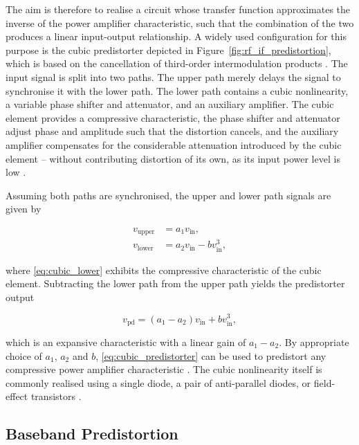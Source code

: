 The aim is therefore to realise a circuit whose transfer function approximates the inverse of the power amplifier characteristic, such that the combination of the two produces a linear input-output relationship. A widely used configuration for this purpose is the cubic predistorter depicted in Figure~\ref{fig:rf_if_predistortion}, which is based on the cancellation of third-order intermodulation products \cite{durukal}. The input signal is split into two paths. The upper path merely delays the signal to synchronise it with the lower path. The lower path contains a cubic nonlinearity, a variable phase shifter and attenuator, and an auxiliary amplifier. The cubic element provides a compressive characteristic, the phase shifter and attenuator adjust phase and amplitude such that the distortion cancels, and the auxiliary amplifier compensates for the considerable attenuation introduced by the cubic element -- without contributing distortion of its own, as its input power level is low \cite{durukal}.

Assuming both paths are synchronised, the upper and lower path signals are given by

\begin{align}
  v_{\text{upper}} &= a_1 v_{\text{in}}, \label{eq:cubic_upper} \\
  v_{\text{lower}} &= a_2 v_{\text{in}} - b v_{\text{in}}^3, \label{eq:cubic_lower}
\end{align}

where \eqref{eq:cubic_lower} exhibits the compressive characteristic of the cubic element. Subtracting the lower path from the upper path yields the predistorter output

\begin{equation}
  v_{\text{pd}} = \left(a_1 - a_2\right) v_{\text{in}} + b v_{\text{in}}^3 ,
  \label{eq:cubic_predistorter}
\end{equation}

which is an expansive characteristic with a linear gain of $a_1 - a_2$. By appropriate choice of $a_1$, $a_2$ and $b$, \eqref{eq:cubic_predistorter} can be used to predistort any compressive power amplifier characteristic \cite{durukal, kenington}. The cubic nonlinearity itself is commonly realised using a single diode, a pair of anti-parallel diodes, or field-effect transistors \cite{durukal}.

\subsection{Baseband Predistortion}\label{sec:baseband_predistortion}

